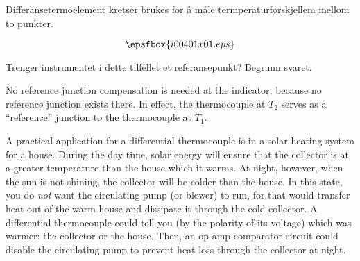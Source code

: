


Differansetermoelement kretser brukes for {\aa} m{\aa}le termperaturforskjellem mellom to punkter. 

$$\epsfbox{i00401x01.eps}$$


Trenger instrumentet i dette tilfellet et referansepunkt? Begrunn svaret. 







No reference junction compensation is needed at the indicator, because no reference junction exists there.  In effect, the thermocouple at $T_2$ serves as a ``reference'' junction to the thermocouple at $T_1$.

A practical application for a differential thermocouple is in a solar heating system for a house.  During the day time, solar energy will ensure that the collector is at a greater temperature than the house which it warms.  At night, however, when the sun is not shining, the collector will be colder than the house.  In this state, you do {\it not} want the circulating pump (or blower) to run, for that would transfer heat out of the warm house and dissipate it through the cold collector.  A differential thermocouple could tell you (by the polarity of its voltage) which was warmer: the collector or the house.  Then, an op-amp comparator circuit could disable the circulating pump to prevent heat loss through the collector at night.











